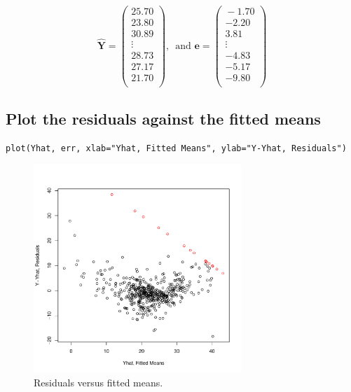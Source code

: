 \documentclass[11pt]{article}
\begin{document}
\[
\mathbf{\hat{Y}} =
\begin{pmatrix}{}
  25.70 \\ 
  23.80 \\ 
  30.89 \\ 
  \vdots \\
  28.73 \\ 
  27.17 \\ 
  21.70 \\ 
  \end{pmatrix},\,\,\,\text{and}\,\,\mathbf{e} =
\begin{pmatrix}{}
  -1.70 \\ 
  -2.20 \\ 
  3.81 \\ 
   \vdots \\
  -4.83 \\ 
  -5.17 \\ 
  -9.80 \\ 
  \end{pmatrix}
\]
\subsection{Plot the residuals against the fitted means}
\label{sec-4-4}



\begin{verbatim}
plot(Yhat, err, xlab="Yhat, Fitted Means", ylab="Y-Yhat, Residuals")
\end{verbatim}

\begin{figure}[H]
\centering
\includegraphics[width=0.7\textwidth]{HW2_4d.pdf}
\caption{Residuals versus fitted means.}
\end{figure}
\end{document}
